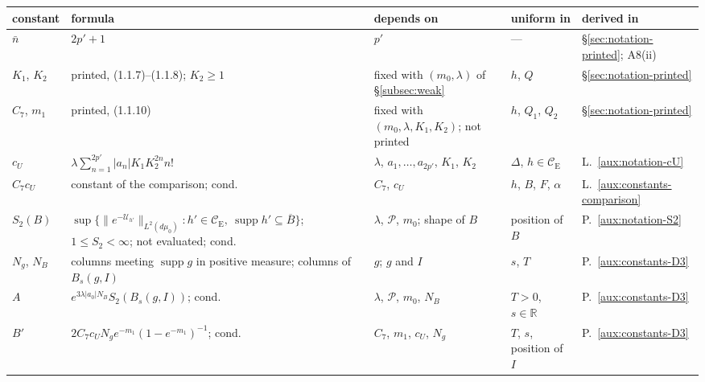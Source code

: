 \documentclass[11pt,a4paper]{article}
\theoremstyle{plain}
\theoremstyle{definition}
\theoremstyle{plain}
\theoremstyle{definition}
\newcommand{\R}{\mathbb{R}}
\newcommand{\CE}{\mathcal{C}_{\mathrm E}}
\DeclareMathOperator{\supp}{supp}
\newcommand{\Uc}{\mathcal U}
\newcommand{\dmu}{d\mu_0}
\begin{document}
\begin{center}
\footnotesize
\begin{tabular}{@{}p{}p{}p{}p{}p{}@{}}
\toprule
constant & formula & depends on & uniform in & derived in\\
\midrule
$\bar n$ & $2p'+1$ & $p'$ & --- & \S\ref{sec:notation-printed}; A8(ii)\\
$K_1$, $K_2$ & printed, (1.1.7)--(1.1.8); $K_2\ge1$ & fixed with $(m_0,\lambda)$ of \S\ref{subsec:weak} &
$h$, $Q$ & \S\ref{sec:notation-printed}\\
$C_7$, $m_1$ & printed, (1.1.10) & fixed with $(m_0,\lambda,K_1,K_2)$; not printed &
$h$, $Q_1$, $Q_2$ & \S\ref{sec:notation-printed}\\
$c_U$ & $\lambda\sum_{n=1}^{2p'}|a_n|K_1K_2^{2n}n!$ & $\lambda$, $a_1,\dots,a_{2p'}$, $K_1$,
$K_2$ & $\Delta$, $h\in\CE$ & L.~\ref{aux:notation-cU}\\
$C_7c_U$ & constant of the comparison; cond. & $C_7$, $c_U$ & $h$, $B$, $F$, $\alpha$ &
L.~\ref{aux:constants-comparison}\\
$S_2(B)$ & $\sup\{\|e^{-\Uc_{h'}}\|_{L^2(\dmu)}:h'\in\CE,\ \supp h'\subseteq\overline B\}$;
$1\le S_2<\infty$; not evaluated; cond. & $\lambda$, $\mathscr P$, $m_0$; shape of $B$ &
position of $B$ & P.~\ref{aux:notation-S2}\\
$N_g$, $N_B$ & columns meeting $\supp g$ in positive measure; columns of $B_s(g,I)$ & $g$;
$g$ and $I$ & $s$, $T$ & P.~\ref{aux:constants-D3}\\
$A$ & $e^{3\lambda|a_0|N_B}S_2(B_s(g,I))$; cond. & $\lambda$, $\mathscr P$, $m_0$, $N_B$ &
$T>0$, $s\in\R$ & P.~\ref{aux:constants-D3}\\
$B'$ & $2C_7c_UN_ge^{-m_1}(1-e^{-m_1})^{-1}$; cond. & $C_7$, $m_1$, $c_U$, $N_g$ & $T$, $s$, position
of $I$ & P.~\ref{aux:constants-D3}\\
\bottomrule
\end{tabular}
\end{center}
\end{document}
